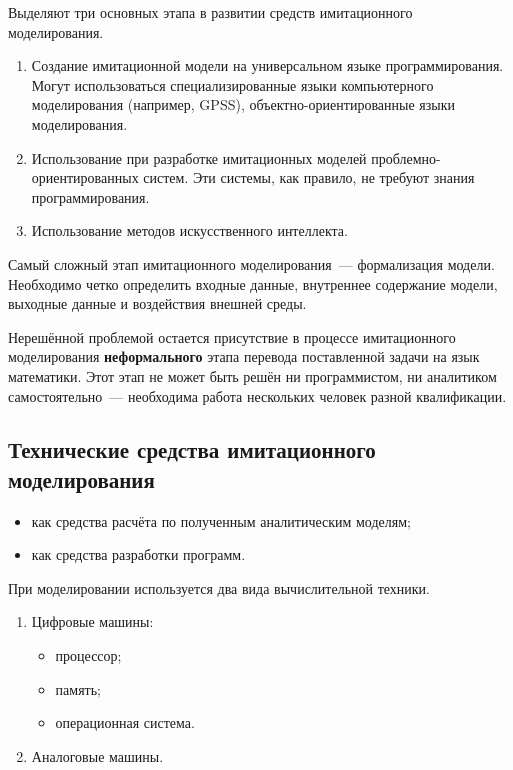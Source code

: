 Выделяют три основных этапа в развитии средств имитационного моделирования.

\begin{enumerate}
    \item Создание имитационной модели на универсальном языке программирования. Могут использоваться специализированные языки компьютерного моделирования (например, GPSS), объектно-ориентированные языки моделирования.
    \item Использование при разработке имитационных моделей проб\-лем\-но-ориен\-тиро\-ван\-ных систем. Эти системы, как правило, не требуют знания программирования.
    \item Использование методов искусственного интеллекта.
\end{enumerate}

Самый сложный этап имитационного моделирования~--- формализация модели. Необходимо четко определить входные данные, внутреннее содержание модели, выходные данные и воздействия внешней среды.

Нерешённой проблемой остается присутствие в процессе имитационного моделирования \textbf{неформального} этапа перевода поставленной задачи на язык математики. Этот этап не может быть решён ни программистом, ни аналитиком самостоятельно~--- необходима работа нескольких человек разной квалификации.

\subsection{Технические средства имитационного моделирования}

\begin{itemize}
    \item как средства расчёта по полученным аналитическим моделям;
    \item как средства разработки программ.
\end{itemize}

При моделировании используется два вида вычислительной техники.

\begin{enumerate}
    \item Цифровые машины:
          \begin{itemize}
              \item процессор;
              \item память;
              \item операционная система.
          \end{itemize}
    \item Аналоговые машины.
\end{enumerate}

